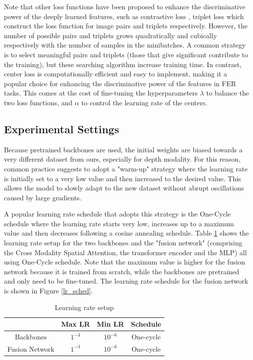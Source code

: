 Note that other loss functions have been proposed to enhance the discriminative power of the deeply learned features, such as contrastive loss \cite{contrastive_loss}, triplet loss \cite{triplet_loss} which construct the loss function for image pairs and triplets respectively\cite{center_loss}. However, the number of possible pairs and triplets grows quadratically and cubically respectively with the number of samples in the minibatches. A common strategy is to select meaningful pairs and triplets (those that give significant contribute to the training), but these searching algorithm increase training time. In contrast, center loss is computationally efficient and easy to implement, making it a popular choice for enhancing the discriminative power of the features in FER tasks. This comes at the cost of fine-tuning the hyperparameters $\lambda$ to balance the two loss functions, and $\alpha$ to control the learning rate of the centers.

\subsection{Experimental Settings}
Because pretrained backbones are used, the initial weights are biased towards a very different dataset from ours, especially for depth modality. For this reason, common practice suggests to adopt a "warm-up" strategy where the learning rate is initially set to a very low value and then increased to the desired value. This allows the model to slowly adapt to the new dataset without abrupt oscillations caused by large gradients.

A popular learning rate schedule that adopts this strategy is the One-Cycle schedule \cite{superconvergence} where the learning rate starts very low, increases up to a maximum value and then decreases following a cosine annealing schedule. Table \ref{lr_setup} shows the learning rate setup for the two backbones and the "fusion network" (comprising the Cross Modality Spatial Attention, the transformer encoder and the MLP) all using One-Cycle schedule. Note that the maximum value is higher for the fusion network because it is trained from scratch, while the backbones are pretrained and only need to be fine-tuned. The learning rate schedule for the fusion network is shown in Figure \ref{lr_sched}.


\begin{table}[H]
    \centering
    \caption{Learning rate setup}
    \begin{tabular}{cccc}
    \hline
     & Max LR & Min LR & Schedule \\
    \hline
    Backbones & $1^{-4}$ & $10^{-6}$ & One-cycle \\
    \hline
    Fusion Network & $1^{-3}$ & $10^{-6}$ & One-cycle\\
    \hline
    \end{tabular}
    \label{lr_setup}
\end{table}



